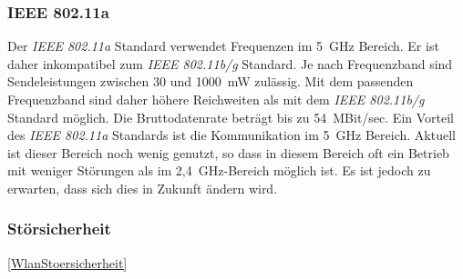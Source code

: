        \subsubsection{IEEE 802.11a}
            Der \emph{IEEE 802.11a} Standard verwendet Frequenzen im 5~GHz Bereich. Er ist daher
            inkompatibel zum \emph{IEEE 802.11b/g} Standard. Je nach Frequenzband sind 
            Sendeleistungen zwischen 30 und 1000~mW zulässig. Mit dem passenden Frequenzband
            sind daher höhere Reichweiten als mit dem \emph{IEEE 802.11b/g} Standard möglich.
            Die Bruttodatenrate beträgt bis zu 54~MBit/sec. 
            Ein Vorteil des \emph{IEEE 802.11a} Standards ist die Kommunikation im 5~GHz Bereich.
            Aktuell ist dieser Bereich noch wenig genutzt, so dass in diesem
            Bereich oft ein Betrieb mit weniger Störungen als im 2,4~GHz-Bereich möglich ist.
            Es ist jedoch zu erwarten, dass sich dies in Zukunft ändern wird.

        \subsubsection{Störsicherheit}\ref{WlanStoersicherheit}

